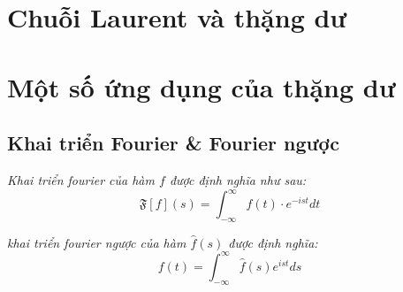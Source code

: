 \documentclass[14pt]{extarticle}
\begin{document}
	
	

	\section{Chuỗi Laurent và thặng dư}
	

	\section{Một số ứng dụng của thặng dư}
	
	

	\subsection{Khai triển Fourier \& Fourier ngược}
	\begin{definition}
		\textit{Khai triển fourier của hàm \(f\) được định nghĩa như sau:}
		\begin{equation}
			\mathfrak{F}[f](s)=\int_{-\infty}^\infty
				f(t)\cdot e^{-ist}dt
			\label{eq:fourier01}
		\end{equation}
	\end{definition}

	\begin{definition}
		\textit{khai triển fourier ngược của hàm $\hat{f}(s)$ được định nghĩa:}
		\begin{equation}
			f(t) = \int_{-\infty}^\infty \hat{f}(s) e^{ist}ds
			\label{eq:fourier02}
		\end{equation}
	\end{definition}
\end{document}
